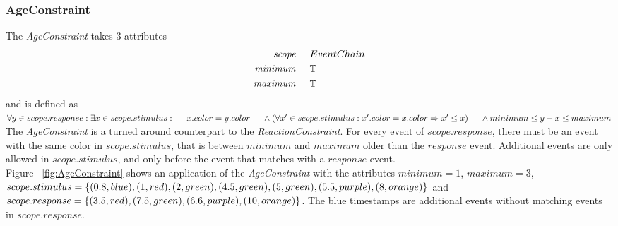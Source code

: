 	\subsubsection{AgeConstraint}
		The \emph{AgeConstraint} takes 3 attributes
		\begin{align*}
			\emph{scope} 	& \hspace{.5cm} EventChain\\
			\emph{minimum}	& \hspace{.5cm} \mathbb{T}\\
			\emph{maximum}	& \hspace{.5cm} \mathbb{T}
		\end{align*}
		and is defined as \\[10pt]
		\begin{math}
			\forall y\in scope.response: \exists x\in scope.stimulus:\\
			\text{\hspace{.5cm}}x.color=y.color\\
			\text{\hspace{.5cm}}\land (\forall x'\in scope.stimulus: x'.color=x.color\Rightarrow x'\leq x)\\
			\text{\hspace{.5cm}}\land minimum \leq y-x \leq maximum
		\end{math}\\[10pt]
		The \emph{AgeConstraint} is a turned around counterpart to the \emph{ReactionConstraint}. For every event of $scope.response$, there must be an event with the same color in $scope.stimulus$, that is between $minimum$ and $maximum$ older than the $response$ event. Additional events are only allowed in $scope.stimulus$, and only before the event that matches with a $response$ event.\\
		Figure~ \ref{fig:AgeConstraint} shows an application of the \emph{AgeConstraint} with the attributes $minimum=1$, $maximum=3$, $scope.stimulus=\{(0.8, blue), (1, red), (2, green), (4.5, green),\\
		(5, green), (5.5, purple), (8, orange)\}$ and $scope.response=\{(3.5, red), (7.5, green),\\
		 (6.6, purple), (10, orange)\}$. The blue timestamps are additional events without matching events in $scope.response$.
